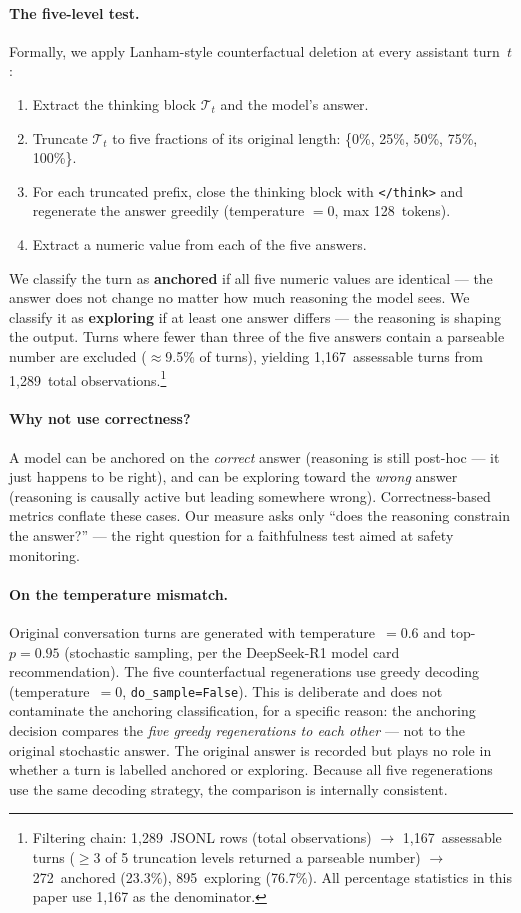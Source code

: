 \documentclass{article}
\begin{document}
\paragraph{The five-level test.}
Formally, we apply Lanham-style counterfactual deletion
\citep{lanham2023} at every assistant turn~$t$:
\begin{enumerate}
  \item Extract the thinking block $\mathcal{T}_t$ and the
        model's answer.
  \item Truncate $\mathcal{T}_t$ to five fractions of its
        original length: \{0\%, 25\%, 50\%, 75\%, 100\%\}.
  \item For each truncated prefix, close the thinking block
        with \texttt{</think>} and regenerate the answer
        greedily (temperature $= 0$, max 128~tokens).
  \item Extract a numeric value from each of the five answers.
\end{enumerate}
We classify the turn as \textbf{anchored} if all five numeric
values are identical --- the answer does not change no matter
how much reasoning the model sees.
We classify it as \textbf{exploring} if at least one answer
differs --- the reasoning is shaping the output.
Turns where fewer than three of the five answers contain a
parseable number are excluded ($\approx$9.5\% of turns),
yielding 1,167~assessable turns from 1,289~total observations.\footnote{%
  Filtering chain: 1,289~JSONL rows (total observations)
  $\to$ 1,167~assessable turns ($\geq$3 of 5 truncation levels
  returned a parseable number)
  $\to$ 272~anchored (23.3\%), 895~exploring (76.7\%).
  All percentage statistics in this paper use 1,167 as the denominator.}

\paragraph{Why not use correctness?}
A model can be anchored on the \emph{correct} answer (reasoning
is still post-hoc --- it just happens to be right), and can be
exploring toward the \emph{wrong} answer (reasoning is causally
active but leading somewhere wrong).
Correctness-based metrics conflate these cases.
Our measure asks only ``does the reasoning constrain the answer?''
--- the right question for a faithfulness test aimed at safety
monitoring.

\paragraph{On the temperature mismatch.}
Original conversation turns are generated with temperature~$= 0.6$
and top-$p = 0.95$ (stochastic sampling, per the DeepSeek-R1 model
card recommendation).
The five counterfactual regenerations use greedy decoding
(temperature~$= 0$, \texttt{do\_sample=False}).
This is deliberate and does not contaminate the anchoring
classification, for a specific reason: the anchoring decision
compares the \emph{five greedy regenerations to each other} ---
not to the original stochastic answer.
The original answer is recorded but plays no role in whether a
turn is labelled anchored or exploring.
Because all five regenerations use the same decoding strategy,
the comparison is internally consistent.
\end{document}
